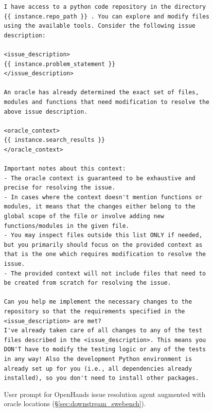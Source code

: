 \begin{figure}[!t]
    \centering
\begin{tcolorbox}[colback=red!6!white, colframe=red!75!black, title={\small User Prompt for OpenHands Issue Resolution Agent Augmented with Oracle Locations (continued)}]
\begin{lstlisting}[basicstyle=\fontsize{7.7}{8}\ttfamily]
I have access to a python code repository in the directory {{ instance.repo_path }} . You can explore and modify files using the available tools. Consider the following issue description:

<issue_description>
{{ instance.problem_statement }}
</issue_description>

An oracle has already determined the exact set of files, modules and functions that need modification to resolve the above issue description.

<oracle_context>
{{ instance.search_results }}
</oracle_context>

Important notes about this context:
- The oracle context is guaranteed to be exhaustive and precise for resolving the issue.
- In cases where the context doesn't mention functions or modules, it means that the changes either belong to the global scope of the file or involve adding new functions/modules in the given file.
- You may inspect files outside this list ONLY if needed, but you primarily should focus on the provided context as that is the one which requires modification to resolve the issue.
- The provided context will not include files that need to be created from scratch for resolving the issue.

Can you help me implement the necessary changes to the repository so that the requirements specified in the <issue_description> are met?
I've already taken care of all changes to any of the test files described in the <issue_description>. This means you DON'T have to modify the testing logic or any of the tests in any way! Also the development Python environment is already set up for you (i.e., all dependencies already installed), so you don't need to install other packages.
\end{lstlisting}
\end{tcolorbox}
\caption{User prompt for OpenHands issue resolution agent augmented with oracle locations (\S\ref{sec:downstream_swebench}).
\label{fig:user_prompt_oracle_augment1}
}
\end{figure}

